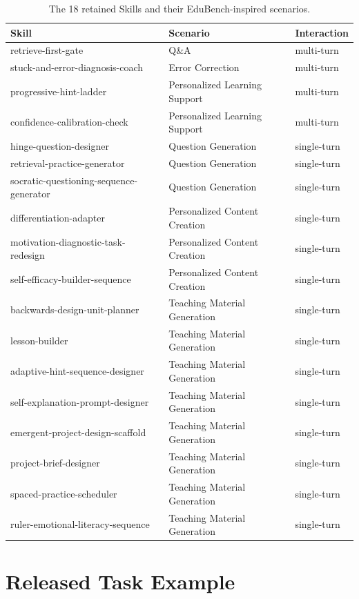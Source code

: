 \documentclass[10pt]{article}
\begin{document}
\begin{table}[H]
\centering
\small
\caption{The 18 retained Skills and their EduBench-inspired scenarios.}
\begin{tabularx}{0.98\textwidth}{>{\ttfamily\raggedright\arraybackslash}Xll}
\toprule
Skill & Scenario & Interaction \\
\midrule
retrieve-first-gate & Q\&A & multi-turn \\
stuck-and-error-diagnosis-coach & Error Correction & multi-turn \\
progressive-hint-ladder & Personalized Learning Support & multi-turn \\
confidence-calibration-check & Personalized Learning Support & multi-turn \\
hinge-question-designer & Question Generation & single-turn \\
retrieval-practice-generator & Question Generation & single-turn \\
socratic-questioning-sequence-generator & Question Generation & single-turn \\
differentiation-adapter & Personalized Content Creation & single-turn \\
motivation-diagnostic-task-redesign & Personalized Content Creation & single-turn \\
self-efficacy-builder-sequence & Personalized Content Creation & single-turn \\
backwards-design-unit-planner & Teaching Material Generation & single-turn \\
lesson-builder & Teaching Material Generation & single-turn \\
adaptive-hint-sequence-designer & Teaching Material Generation & single-turn \\
self-explanation-prompt-designer & Teaching Material Generation & single-turn \\
emergent-project-design-scaffold & Teaching Material Generation & single-turn \\
project-brief-designer & Teaching Material Generation & single-turn \\
spaced-practice-scheduler & Teaching Material Generation & single-turn \\
ruler-emotional-literacy-sequence & Teaching Material Generation & single-turn \\
\bottomrule
\end{tabularx}
\end{table}

\section{Released Task Example}
\end{document}
